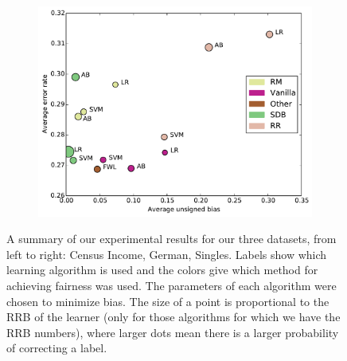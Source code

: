 \documentclass[twoside,leqno,twocolumn]{article}
\begin{document}
\begin{figure}[t]
\begin{subfigure}{0.65\columnwidth}
\end{subfigure}
\hspace{1mm}
\begin{subfigure}{0.65\columnwidth}
\includegraphics[width=\columnwidth]{images/singles_scatter_plot.pdf}
\end{subfigure}
\caption{A summary of our experimental results for our three datasets, from
left to right: Census Income, German, Singles.  Labels show which learning algorithm is used and the colors give which method for achieving fairness was used.  The parameters of each algorithm
were chosen to minimize bias. The size of a point is proportional to the RRB of
the learner (only for those algorithms for which we have the RRB numbers), where larger dots mean there is a larger probability of correcting
a label.} 
\label{fig:scatterplots} 
\end{figure}
\end{document}
